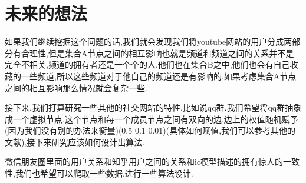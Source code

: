 \documentclass[11pt, a4paper]{article}
\begin{document}
  \section{未来的想法}

  如果我们继续挖掘这个问题的话,我们就会发现我们将youtube网站的用户分成两部分有合理性,但是集合A节点之间的相互影响也就是频道和频道之间的关系并不是完全不相关,频道的拥有者还是一个个的人,他们也在集合B之中,他们也会有自己收藏的一些频道,所以这些频道对于他自己的频道还是有影响的.如果考虑集合A节点之间的相互影响那么情况就会复杂一些.

  接下来,我们打算研究一些其他的社交网站的特性.比如说qq群.我们希望将qq群抽象成一个虚拟节点,这个节点和每一个成员节点之间有双向的边,边上的权值随机赋予(因为我们没有别的办法来衡量)(0.5 0.1 0.01)(具体如何赋值,我们可以参考其他的文献),接下来研究应该如何设计出算法.

  微信朋友圈里面的用户关系和知乎用户之间的关系和ic模型描述的拥有惊人的一致性,我们也希望可以爬取一些数据,进行一些算法设计.
\end{document}
